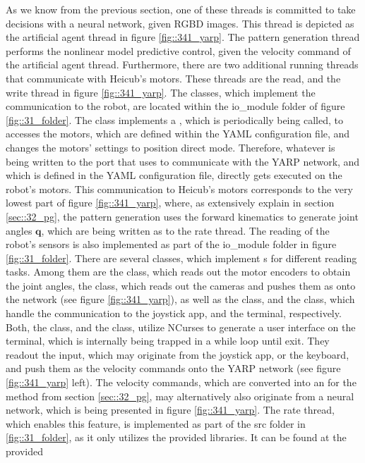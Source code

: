 As we know from the previous section, one of these threads is committed to take decisions with a neural network, given RGBD images. This thread is depicted as the artificial agent thread in figure \ref{fig::341_yarp}. The pattern generation thread performs the nonlinear model predictive control, given the velocity command of the artificial agent thread. Furthermore, there are two additional running threads that communicate with Heicub's motors. These threads are the read, and the write thread in figure \ref{fig::341_yarp}. The classes, which implement the communication to the robot, are located within the io\_module folder of figure \ref{fig::31_folder}. The  class implements a , which is periodically being called, to accesses the motors, which are defined within the YAML configuration file, and changes the motors' settings to position direct mode. Therefore, whatever is being written to the port that  uses to communicate with the YARP network, and which is defined in the YAML configuration file, directly gets executed on the robot's motors. This communication to Heicub's motors corresponds to the very lowest part of figure \ref{fig::341_yarp}, where, as extensively explain in section \ref{sec::32_pg}, the pattern generation uses the forward kinematics to generate joint angles $\bm{q}$, which are being written as  to the  rate thread. The reading of the robot's sensors is also implemented as part of the io\_module folder in figure \ref{fig::31_folder}. There are several classes, which implement s for different reading tasks. Among them are the  class, which reads out the motor encoders to obtain the joint angles, the  class, which reads out the cameras and pushes them as  onto the network (see figure \ref{fig::341_yarp}), as well as the  class, and the  class, which handle the communication to the joystick app, and the terminal, respectively. Both, the  class, and the  class, utilize NCurses to generate a user interface on the terminal, which is internally being trapped in a while loop until exit. They readout the input, which may originate from the joystick app, or the keyboard, and push them as the velocity commands onto the YARP network (see figure \ref{fig::341_yarp} left). The velocity commands, which are converted into an  for the  method from section \ref{sec::32_pg}, may alternatively also originate from a neural network, which is being presented in figure \ref{fig::341_yarp}. The  rate thread, which enables this feature, is implemented as part of the src folder in \ref{fig::31_folder}, as it only utilizes the provided libraries. It can be found at the provided 